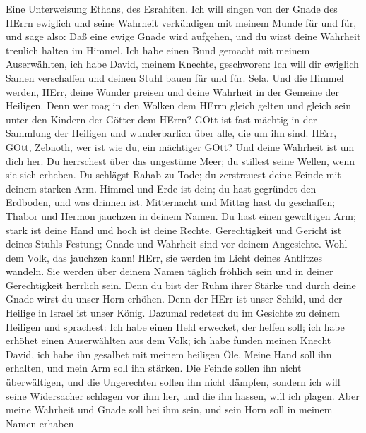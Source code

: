  Eine Unterweisung Ethans, des Esrahiten.  Ich
will singen von der Gnade des HErrn ewiglich und seine Wahrheit
verkündigen mit meinem Munde für und für,  und sage also:
Daß eine ewige Gnade wird aufgehen, und du wirst deine Wahrheit treulich
halten im Himmel.  Ich habe einen Bund gemacht mit meinem
Auserwählten, ich habe David, meinem Knechte, geschworen: 
Ich will dir ewiglich Samen verschaffen und deinen Stuhl bauen für und
für. Sela.  Und die Himmel werden, HErr, deine Wunder
preisen und deine Wahrheit in der Gemeine der Heiligen. 
Denn wer mag in den Wolken dem HErrn gleich gelten und gleich sein unter
den Kindern der Götter dem HErrn?  GOtt ist fast mächtig in
der Sammlung der Heiligen und wunderbarlich über alle, die um ihn sind.
 HErr, GOtt, Zebaoth, wer ist wie du, ein mächtiger GOtt?
Und deine Wahrheit ist um dich her.  Du herrschest über das
ungestüme Meer; du stillest seine Wellen, wenn sie sich erheben.
 Du schlägst Rahab zu Tode; du zerstreuest deine Feinde mit
deinem starken Arm.  Himmel und Erde ist dein; du hast
gegründet den Erdboden, und was drinnen ist.  Mitternacht
und Mittag hast du geschaffen; Thabor und Hermon jauchzen in deinem
Namen.  Du hast einen gewaltigen Arm; stark ist deine Hand
und hoch ist deine Rechte.  Gerechtigkeit und Gericht ist
deines Stuhls Festung; Gnade und Wahrheit sind vor deinem Angesichte.
 Wohl dem Volk, das jauchzen kann! HErr, sie werden im
Licht deines Antlitzes wandeln.  Sie werden über deinem
Namen täglich fröhlich sein und in deiner Gerechtigkeit herrlich sein.
 Denn du bist der Ruhm ihrer Stärke und durch deine Gnade
wirst du unser Horn erhöhen.  Denn der HErr ist unser
Schild, und der Heilige in Israel ist unser König.  Dazumal
redetest du im Gesichte zu deinem Heiligen und sprachest: Ich habe einen
Held erwecket, der helfen soll; ich habe erhöhet einen Auserwählten aus
dem Volk;  ich habe funden meinen Knecht David, ich habe
ihn gesalbet mit meinem heiligen Öle.  Meine Hand soll ihn
erhalten, und mein Arm soll ihn stärken.  Die Feinde sollen
ihn nicht überwältigen, und die Ungerechten sollen ihn nicht dämpfen,
 sondern ich will seine Widersacher schlagen vor ihm her,
und die ihn hassen, will ich plagen.  Aber meine Wahrheit
und Gnade soll bei ihm sein, und sein Horn soll in meinem Namen erhaben
